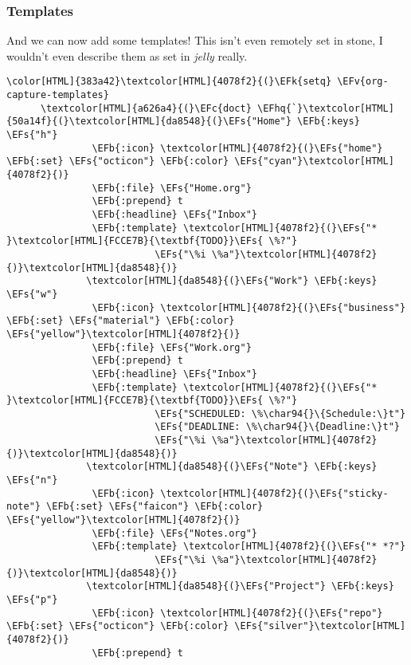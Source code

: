 \documentclass{scrartcl}
\newcommand{\EFk}[1]{\textcolor{EFk}{#1}} %
\newcommand{\EFs}[1]{\textcolor{EFs}{#1}} %
\newcommand{\EFb}[1]{\textcolor{EFb}{#1}} %
\newcommand{\EFc}[1]{\textcolor{EFc}{#1}} %
\newcommand{\EFv}[1]{\textcolor{EFv}{#1}} %
\newcommand{\EFhq}[1]{\textcolor{EFhq}{#1}} %
\begin{document}
\subsubsection{Templates}
\label{sec:orgef86355}

And we can now add some templates! This isn't even remotely set in stone, I wouldn't even describe them as set in \emph{jelly} really.
\begin{Code}
\begin{Verbatim}[]
\color[HTML]{383a42}\textcolor[HTML]{4078f2}{(}\EFk{setq} \EFv{org-capture-templates}
      \textcolor[HTML]{a626a4}{(}\EFc{doct} \EFhq{`}\textcolor[HTML]{50a14f}{(}\textcolor[HTML]{da8548}{(}\EFs{"Home"} \EFb{:keys} \EFs{"h"}
               \EFb{:icon} \textcolor[HTML]{4078f2}{(}\EFs{"home"} \EFb{:set} \EFs{"octicon"} \EFb{:color} \EFs{"cyan"}\textcolor[HTML]{4078f2}{)}
               \EFb{:file} \EFs{"Home.org"}
               \EFb{:prepend} t
               \EFb{:headline} \EFs{"Inbox"}
               \EFb{:template} \textcolor[HTML]{4078f2}{(}\EFs{"* }\textcolor[HTML]{FCCE7B}{\textbf{TODO}}\EFs{ \%?"}
                          \EFs{"\%i \%a"}\textcolor[HTML]{4078f2}{)}\textcolor[HTML]{da8548}{)}
              \textcolor[HTML]{da8548}{(}\EFs{"Work"} \EFb{:keys} \EFs{"w"}
               \EFb{:icon} \textcolor[HTML]{4078f2}{(}\EFs{"business"} \EFb{:set} \EFs{"material"} \EFb{:color} \EFs{"yellow"}\textcolor[HTML]{4078f2}{)}
               \EFb{:file} \EFs{"Work.org"}
               \EFb{:prepend} t
               \EFb{:headline} \EFs{"Inbox"}
               \EFb{:template} \textcolor[HTML]{4078f2}{(}\EFs{"* }\textcolor[HTML]{FCCE7B}{\textbf{TODO}}\EFs{ \%?"}
                          \EFs{"SCHEDULED: \%\char94{}\{Schedule:\}t"}
                          \EFs{"DEADLINE: \%\char94{}\{Deadline:\}t"}
                          \EFs{"\%i \%a"}\textcolor[HTML]{4078f2}{)}\textcolor[HTML]{da8548}{)}
              \textcolor[HTML]{da8548}{(}\EFs{"Note"} \EFb{:keys} \EFs{"n"}
               \EFb{:icon} \textcolor[HTML]{4078f2}{(}\EFs{"sticky-note"} \EFb{:set} \EFs{"faicon"} \EFb{:color} \EFs{"yellow"}\textcolor[HTML]{4078f2}{)}
               \EFb{:file} \EFs{"Notes.org"}
               \EFb{:template} \textcolor[HTML]{4078f2}{(}\EFs{"* *?"}
                          \EFs{"\%i \%a"}\textcolor[HTML]{4078f2}{)}\textcolor[HTML]{da8548}{)}
              \textcolor[HTML]{da8548}{(}\EFs{"Project"} \EFb{:keys} \EFs{"p"}
               \EFb{:icon} \textcolor[HTML]{4078f2}{(}\EFs{"repo"} \EFb{:set} \EFs{"octicon"} \EFb{:color} \EFs{"silver"}\textcolor[HTML]{4078f2}{)}
               \EFb{:prepend} t

\end{Verbatim}
\end{Code}
\end{document}
